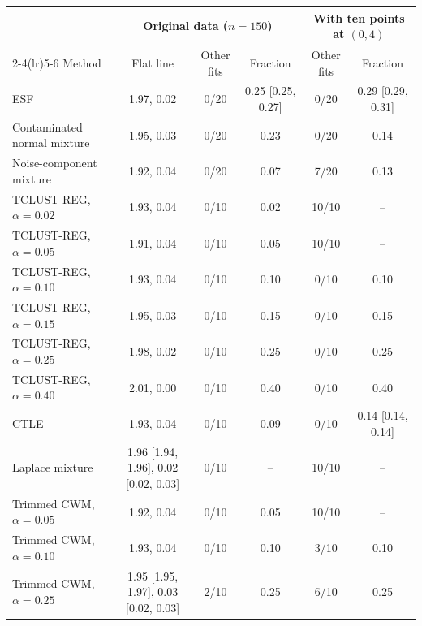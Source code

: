\begin{tabular}{lccccc}
\toprule
 & \multicolumn{3}{c}{Original data ($n=150$)} & \multicolumn{2}{c}{With ten points at $(0,4)$} \\
\cmidrule(lr){2-4}\cmidrule(lr){5-6}
Method & Flat line & Other fits & Fraction & Other fits & Fraction \\
\midrule
ESF & 1.97, 0.02 & 0/20 & 0.25 [0.25, 0.27] & 0/20 & 0.29 [0.29, 0.31] \\
Contaminated normal mixture & 1.95, 0.03 & 0/20 & 0.23 & 0/20 & 0.14 \\
Noise-component mixture & 1.92, 0.04 & 0/20 & 0.07 & 7/20 & 0.13 \\
TCLUST-REG, $\alpha=0.02$ & 1.93, 0.04 & 0/10 & 0.02 & 10/10 & -- \\
TCLUST-REG, $\alpha=0.05$ & 1.91, 0.04 & 0/10 & 0.05 & 10/10 & -- \\
TCLUST-REG, $\alpha=0.10$ & 1.93, 0.04 & 0/10 & 0.10 & 0/10 & 0.10 \\
TCLUST-REG, $\alpha=0.15$ & 1.95, 0.03 & 0/10 & 0.15 & 0/10 & 0.15 \\
TCLUST-REG, $\alpha=0.25$ & 1.98, 0.02 & 0/10 & 0.25 & 0/10 & 0.25 \\
TCLUST-REG, $\alpha=0.40$ & 2.01, 0.00 & 0/10 & 0.40 & 0/10 & 0.40 \\
CTLE & 1.93, 0.04 & 0/10 & 0.09 & 0/10 & 0.14 [0.14, 0.14] \\
Laplace mixture & 1.96 [1.94, 1.96], 0.02 [0.02, 0.03] & 0/10 & -- & 10/10 & -- \\
Trimmed CWM, $\alpha=0.05$ & 1.92, 0.04 & 0/10 & 0.05 & 10/10 & -- \\
Trimmed CWM, $\alpha=0.10$ & 1.93, 0.04 & 0/10 & 0.10 & 3/10 & 0.10 \\
Trimmed CWM, $\alpha=0.25$ & 1.95 [1.95, 1.97], 0.03 [0.02, 0.03] & 2/10 & 0.25 & 6/10 & 0.25 \\
\bottomrule
\end{tabular}